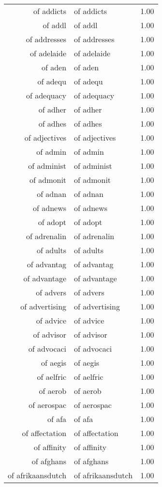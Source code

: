 \begin{table}[ht]
\begin{tabular}{rlr}
  of addicts & of addicts & 1.00 \\ 
  of addl & of addl & 1.00 \\ 
  of addresses & of addresses & 1.00 \\ 
  of adelaide & of adelaide & 1.00 \\ 
  of aden & of aden & 1.00 \\ 
  of adequ & of adequ & 1.00 \\ 
  of adequacy & of adequacy & 1.00 \\ 
  of adher & of adher & 1.00 \\ 
  of adhes & of adhes & 1.00 \\ 
  of adjectives & of adjectives & 1.00 \\ 
  of admin & of admin & 1.00 \\ 
  of administ & of administ & 1.00 \\ 
  of admonit & of admonit & 1.00 \\ 
  of adnan & of adnan & 1.00 \\ 
  of adnews & of adnews & 1.00 \\ 
  of adopt & of adopt & 1.00 \\ 
  of adrenalin & of adrenalin & 1.00 \\ 
  of adults & of adults & 1.00 \\ 
  of advantag & of advantag & 1.00 \\ 
  of advantage & of advantage & 1.00 \\ 
  of advers & of advers & 1.00 \\ 
  of advertising & of advertising & 1.00 \\ 
  of advice & of advice & 1.00 \\ 
  of advisor & of advisor & 1.00 \\ 
  of advocaci & of advocaci & 1.00 \\ 
  of aegis & of aegis & 1.00 \\ 
  of aelfric & of aelfric & 1.00 \\ 
  of aerob & of aerob & 1.00 \\ 
  of aerospac & of aerospac & 1.00 \\ 
  of afa & of afa & 1.00 \\ 
  of affectation & of affectation & 1.00 \\ 
  of affinity & of affinity & 1.00 \\ 
  of afghans & of afghans & 1.00 \\ 
  of afrikaansdutch & of afrikaansdutch & 1.00 \\ 

\end{tabular}
\end{table}
